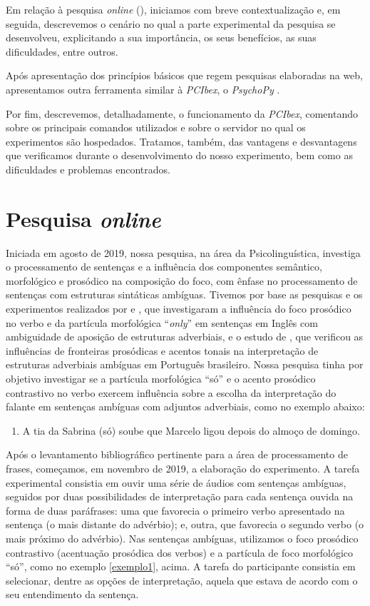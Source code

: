 \documentclass{textolivre}
\begin{document}
Em relação à pesquisa \textit{online} (), iniciamos com breve contextualização e, em seguida, descrevemos o cenário no qual a parte experimental da pesquisa se desenvolveu, explicitando a sua importância, os seus benefícios, as suas dificuldades, entre outros.

Após apresentação dos princípios básicos que regem pesquisas elaboradas na web, apresentamos outra ferramenta similar à \emph{PCIbex}, o \emph{PsychoPy} \cite{peirce2007}.

Por fim, descrevemos, detalhadamente, o funcionamento da \emph{PCIbex}, comentando sobre os principais comandos utilizados e sobre o servidor no qual os experimentos são hospedados. Tratamos, também, das vantagens e desvantagens que verificamos durante o desenvolvimento do nosso experimento, bem como as dificuldades e problemas encontrados.

\section{Pesquisa \textit{online}}\label{sec-pesquisa}
Iniciada em agosto de 2019, nossa pesquisa, na área da Psicolinguística, investiga o processamento de sentenças e a influência dos componentes semântico, morfológico e prosódico na composição do foco, com ênfase no processamento de sentenças com estruturas sintáticas ambíguas. Tivemos por base as pesquisas e os experimentos realizados por \textcite{carlson2014} e \textcite{carlson2018}, que investigaram a influência do foco prosódico no verbo e da partícula morfológica “\emph{only}” em sentenças em Inglês com ambiguidade de aposição de estruturas adverbiais, e o estudo de \textcite{fonseca2019}, que verificou as influências de fronteiras prosódicas e acentos tonais na interpretação de estruturas adverbiais ambíguas em Português brasileiro. Nossa pesquisa tinha por objetivo investigar se a partícula morfológica “só” e o acento prosódico contrastivo no verbo exercem influência sobre a escolha da interpretação do falante em sentenças ambíguas com adjuntos adverbiais, como no exemplo abaixo:

\begin{enumerate}[label={(\arabic*)},leftmargin=2\parindent,topsep=10pt]
\item\label{exemplo1} A tia da Sabrina (só) soube que Marcelo ligou depois do almoço de domingo.
\end{enumerate}

Após o levantamento bibliográfico pertinente para a área de processamento de frases, começamos, em novembro de 2019, a elaboração do experimento. A tarefa experimental consistia em ouvir uma série de áudios com sentenças ambíguas, seguidos por duas possibilidades de interpretação para cada sentença ouvida na forma de duas paráfrases: uma que favorecia o primeiro verbo apresentado na sentença (o mais distante do advérbio); e, outra, que favorecia o segundo verbo (o mais próximo do advérbio). Nas sentenças ambíguas, utilizamos o foco prosódico contrastivo (acentuação prosódica dos verbos) e a partícula de foco morfológico “só”, como no exemplo \ref{exemplo1}, acima. A tarefa do participante consistia em selecionar, dentre as opções de interpretação, aquela que estava de acordo com o seu entendimento da sentença.
\end{document}
